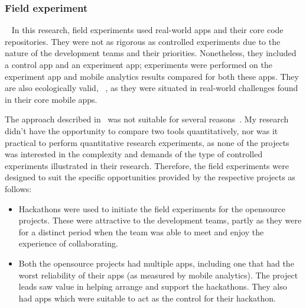 \subsubsection{Field experiment}~\label{section-field-experiment-method}
In this research, field experiments used real-world apps and their core code repositories. They were not as rigorous as controlled experiments due to the nature of the development teams and their priorities. Nonetheless, they included a control app and an experiment app;  experiments were performed on the experiment app and mobile analytics results compared for both these apps. They are also ecologically valid, ~, as they were situated in real-world challenges found in their core mobile apps.

The approach described in~ was not suitable for several reasons~. 
%
My research didn't have the opportunity to compare two tools quantitatively, nor was it practical to perform quantitative research experiments, as none of the projects was interested in the complexity and demands of the type of controlled experiments illustrated in their research. Therefore, the field experiments were designed to suit the specific opportunities provided by the respective projects as follows:
\begin{itemize}
    \item Hackathons were used to initiate the field experiments for the opensource projects. These were attractive to the development teams, partly as they were for a distinct period when the team was able to meet and enjoy the experience of collaborating.
    \item Both the opensource projects had multiple apps, including one that had the worst reliability of their apps (as measured by mobile analytics). The project leads saw value in helping arrange and support the hackathons. They also had apps which were suitable to act as the control for their hackathon. 
\end{itemize}

